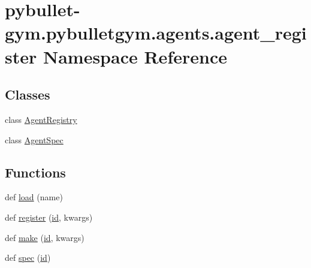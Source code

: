\hypertarget{namespacepybullet-gym_1_1pybulletgym_1_1agents_1_1agent__register}{}\section{pybullet-\/gym.pybulletgym.\+agents.\+agent\+\_\+register Namespace Reference}
\label{namespacepybullet-gym_1_1pybulletgym_1_1agents_1_1agent__register}
\subsection*{Classes}
\begin{DoxyCompactItemize}
\item 
class \hyperlink{classpybullet-gym_1_1pybulletgym_1_1agents_1_1agent__register_1_1_agent_registry}{Agent\+Registry}
\item 
class \hyperlink{classpybullet-gym_1_1pybulletgym_1_1agents_1_1agent__register_1_1_agent_spec}{Agent\+Spec}
\end{DoxyCompactItemize}
\subsection*{Functions}
\begin{DoxyCompactItemize}
\item 
def \hyperlink{namespacepybullet-gym_1_1pybulletgym_1_1agents_1_1agent__register_aa6210d9a5e797a60eeed1c01d755c75b}{load} (name)
\item 
def \hyperlink{namespacepybullet-gym_1_1pybulletgym_1_1agents_1_1agent__register_a6cc9f1f5e038bfd3be211473def3b9c1}{register} (\hyperlink{namespacepybullet-gym_1_1pybulletgym_1_1agents_a0c7585c58d4374c748bb1a19ca9ae5b7}{id}, kwargs)
\item 
def \hyperlink{namespacepybullet-gym_1_1pybulletgym_1_1agents_1_1agent__register_a7f3126201e73cf61f90c5ae7d07e5f03}{make} (\hyperlink{namespacepybullet-gym_1_1pybulletgym_1_1agents_a0c7585c58d4374c748bb1a19ca9ae5b7}{id}, kwargs)
\item 
def \hyperlink{namespacepybullet-gym_1_1pybulletgym_1_1agents_1_1agent__register_a718effab0760134efbe18eebee7ec11a}{spec} (\hyperlink{namespacepybullet-gym_1_1pybulletgym_1_1agents_a0c7585c58d4374c748bb1a19ca9ae5b7}{id})
\end{DoxyCompactItemize}
